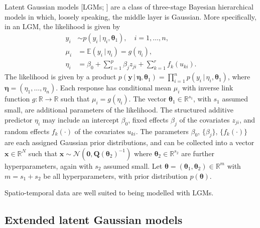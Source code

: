 \documentclass[a4paper, nobind]{templates/ociamthesis}
\newcommand{\x}{\mathbf{x}}
\newcommand{\y}{\mathbf{y}}
\newcommand{\btheta}{\bm{\theta}}
\newcommand{\bmeta}{\bm{\eta}}
\begin{document}
Latent Gaussian models {[}LGMs; \textcite{rue2009approximate}{]} are a class of three-stage Bayesian hierarchical models in which, loosely speaking, the middle layer is Gaussian.
More specifically, in an LGM, the likelihood is given by
\begin{align*}
y_i &\sim p(y_i \, | \, \eta_i, \btheta_1), \quad i = 1, \ldots, n, \\
\mu_i &= \mathbb{E}(y_i \, | \, \eta_i) = g(\eta_i), \\
\eta_i &= \beta_0 + \sum_{l = 1}^{p} \beta_j z_{ji} + \sum_{k = 1}^{r} f_k(u_{ki}).
\end{align*}
The likelihood is given by a product \(p(\y \, | \, \bmeta, \btheta_1) = \prod_{i = 1}^n p(y_i \, | \, \eta_i, \btheta_1)\), where \(\bmeta = (\eta_1, \ldots, \eta_n)\).
Each response has conditional mean \(\mu_i\) with inverse link function \(g: \mathbb{R} \to \mathbb{R}\) such that \(\mu_i = g(\eta_i)\).
The vector \(\btheta_1 \in \mathbb{R}^{s_1}\), with \(s_1\) assumed small, are additional parameters of the likelihood.
The structured additive predictor \(\eta_i\) may include an intercept \(\beta_0\), fixed effects \(\beta_j\) of the covariates \(z_{ji}\), and random effects \(f_k(\cdot)\) of the covariates \(u_{ki}\).
The parameters \(\beta_0\), \(\{\beta_j\}\), \(\{f_k(\cdot)\}\) are each assigned Gaussian prior distributions, and can be collected into a vector \(\x \in \mathbb{R}^N\) such that \(\x \sim \mathcal{N}(\mathbf{0}, \mathbf{Q}(\btheta_2)^{-1})\) where \(\btheta_2 \in \mathbb{R}^{s_2}\) are further hyperparameters, again with \(s_2\) assumed small.
Let \(\btheta = (\btheta_1, \btheta_2) \in \mathbb{R}^m\) with \(m = s_1 + s_2\) be all hyperparameters, with prior distribution \(p(\btheta)\).

Spatio-temporal data are well suited to being modelled with LGMs.

\hypertarget{extended-latent-gaussian-models}{%
\subsection{Extended latent Gaussian models}\label{extended-latent-gaussian-models}}
\end{document}
